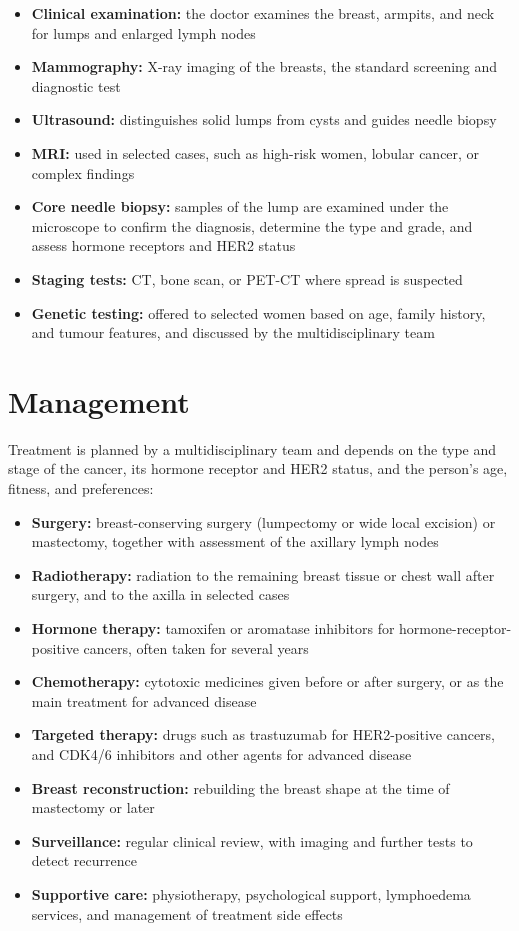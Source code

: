 \begin{itemize}
    \item \textbf{Clinical examination:} the doctor examines the breast, armpits, and neck for lumps and enlarged lymph nodes
    \item \textbf{Mammography:} X-ray imaging of the breasts, the standard screening and diagnostic test
    \item \textbf{Ultrasound:} distinguishes solid lumps from cysts and guides needle biopsy
    \item \textbf{MRI:} used in selected cases, such as high-risk women, lobular cancer, or complex findings
    \item \textbf{Core needle biopsy:} samples of the lump are examined under the microscope to confirm the diagnosis, determine the type and grade, and assess hormone receptors and HER2 status
    \item \textbf{Staging tests:} CT, bone scan, or PET-CT where spread is suspected
    \item \textbf{Genetic testing:} offered to selected women based on age, family history, and tumour features, and discussed by the multidisciplinary team
\end{itemize}

\section*{Management}
Treatment is planned by a multidisciplinary team and depends on the type and stage of the cancer, its hormone receptor and HER2 status, and the person's age, fitness, and preferences:

\begin{itemize}
    \item \textbf{Surgery:} breast-conserving surgery (lumpectomy or wide local excision) or mastectomy, together with assessment of the axillary lymph nodes
    \item \textbf{Radiotherapy:} radiation to the remaining breast tissue or chest wall after surgery, and to the axilla in selected cases
    \item \textbf{Hormone therapy:} tamoxifen or aromatase inhibitors for hormone-receptor-positive cancers, often taken for several years
    \item \textbf{Chemotherapy:} cytotoxic medicines given before or after surgery, or as the main treatment for advanced disease
    \item \textbf{Targeted therapy:} drugs such as trastuzumab for HER2-positive cancers, and CDK4/6 inhibitors and other agents for advanced disease
    \item \textbf{Breast reconstruction:} rebuilding the breast shape at the time of mastectomy or later
    \item \textbf{Surveillance:} regular clinical review, with imaging and further tests to detect recurrence
    \item \textbf{Supportive care:} physiotherapy, psychological support, lymphoedema services, and management of treatment side effects
\end{itemize}

